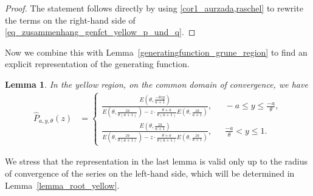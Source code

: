 \documentclass[12pt]{article}
\newcommand{\1}{\mathds{1}}
\theoremstyle{definition}
\theoremstyle{plain}
\newtheorem{Lemma}[definition]{Lemma}
\theoremstyle{remark}
\begin{document}
\begin{proof}
    The statement follows directly by using \eqref{cor1_aurzada,raschel}
    to rewrite the terms on the right-hand side of \eqref{eq_zusammenhang_genfct_yellow_p_und_q}.
\end{proof}
Now we combine this with Lemma~\ref{generatingfunction_grune_region} to find an explicit representation of the generating function. 
\begin{Lemma}\label{generatingfunction_gelbe_region}
    In the yellow region, on the common domain of convergence, we have
    \begin{align*}
        \hat{P}_{a,y,\theta}(z)
        &=\begin{cases}
           \frac{E\left(\theta,\frac{-\theta zy}{a+1}\right)}{E\left(\theta,\frac{za}{\theta(a+1)}\right)-z\cdot\frac{ \theta +a}{\theta(a+1)}E\left(\theta,\frac{za}{a+1}\right)},~~&~-a\leq y \leq \frac{-a}{\theta},
            \\\frac{E\left(\theta,\frac{za}{a+1}\right)}{E\left(\theta,\frac{za}{\theta(a+1)}\right)-z\cdot\frac{\theta +a}{\theta(a+1)}E\left(\theta,\frac{za}{a+1}\right)},~~&~\frac{-a}{\theta}<y\leq1.
        \end{cases}    
    \end{align*}
\end{Lemma}

We stress that the representation in the last lemma is valid only up to the radius of convergence of the series on the left-hand side, which will be determined in Lemma~\ref{lemma_root_yellow}.
\end{document}
